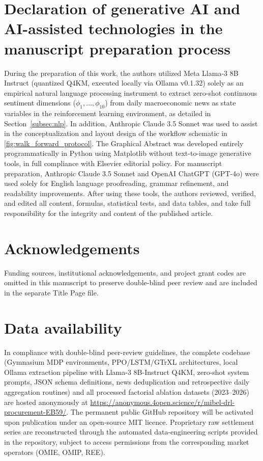 \documentclass[final,5p,times,numbers]{elsarticle}
\renewcommand{\_}{\oldunderscore\allowbreak}
\begin{document}
\section*{Declaration of generative AI and AI-assisted technologies in the manuscript preparation process}
During the preparation of this work, the authors utilized Meta Llama-3 8B Instruct (quantized Q4\_K\_M, executed locally via Ollama v0.1.32) solely as an empirical natural language processing instrument to extract zero-shot continuous sentiment dimensions ($\phi_1, \dots, \phi_{10}$) from daily macroeconomic news as state variables in the reinforcement learning environment, as detailed in Section~\ref{subsec:nlp}. In addition, Anthropic Claude 3.5 Sonnet was used to assist in the conceptualization and layout design of the workflow schematic in \cref{fig:walk_forward_protocol}. The Graphical Abstract was developed entirely programmatically in Python using Matplotlib without text-to-image generative tools, in full compliance with Elsevier editorial policy. For manuscript preparation, Anthropic Claude 3.5 Sonnet and OpenAI ChatGPT (GPT-4o) were used solely for English language proofreading, grammar refinement, and readability improvements. After using these tools, the authors reviewed, verified, and edited all content, formulas, statistical tests, and data tables, and take full responsibility for the integrity and content of the published article.

\section*{Acknowledgements}
Funding sources, institutional acknowledgements, and project grant codes are omitted in this manuscript to preserve double-blind peer review and are included in the separate Title Page file.

\section*{Data availability}
{\sloppy
In compliance with double-blind peer-review guidelines, the complete codebase (Gymnasium MDP environments, PPO\slash LSTM\slash GTrXL architectures, local Ollama extraction pipeline with Llama-3 8B-Instruct Q4\_K\_M, zero-shot system prompts, JSON schema definitions, news deduplication and retrospective daily aggregation routines) and all processed factorial ablation datasets (2023--2026) are hosted anonymously at \url{https://anonymous.4open.science/r/mibel-drl-procurement-EB59/}. The permanent public GitHub repository will be activated upon publication under an open-source MIT licence. Proprietary raw settlement series are reconstructed through the automated data-engineering scripts provided in the repository, subject to access permissions from the corresponding market operators (OMIE, OMIP, REE).
\par}

\clearpage
\onecolumn

\clearpage
\twocolumn



\end{document}
